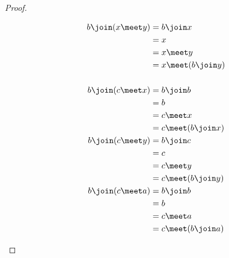 \begin{proof}
\begin{enumerate}
\begin{multicols}{3}
\begin{align*}
      b \join (x \meet y)
        &= b \join x
      \\&= x
      \\&= x \meet y
      \\&= x \meet ( b\join y)
      \\
      \\
      b \join (c \meet x)
        &= b \join b
      \\&= b
      \\&= c \meet x
      \\&= c \meet ( b\join x)
      \\
      b \join (c \meet y)
        &= b \join c
      \\&= c
      \\&= c \meet y
      \\&= c \meet ( b\join y)
      \\
      b \join (c \meet a)
        &= b \join b
      \\&= b
      \\&= c \meet a
      \\&= c \meet ( b\join a)
    \end{align*}
\end{multicols}
\end{enumerate}
\end{proof}



